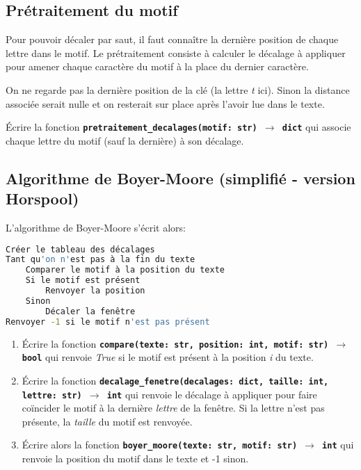 \documentclass[a4paper,11pt]{article}
\begin{document}
\subsection{Prétraitement du motif}
Pour pouvoir décaler par saut, il faut connaître la dernière position de chaque lettre dans le motif. Le prétraitement consiste à calculer le décalage à appliquer pour amener chaque caractère du motif à la place du dernier caractère.
\begin{aretenir}[Remarque]
    On ne regarde pas la dernière position de la clé (la lettre \emph{t} ici). Sinon la distance associée serait nulle et on resterait sur place après l’avoir lue dans le texte.
\end{aretenir}
\begin{activite}
    Écrire la fonction \textbf{\texttt{pretraitement\_decalages(motif: str) $\rightarrow$ dict}} qui associe chaque lettre du motif (sauf la dernière) à son décalage.
\end{activite}
\subsection{Algorithme de Boyer-Moore (simplifié - version Horspool)}
L'algorithme de Boyer-Moore s'écrit alors:
\begin{center}
\begin{lstlisting}[language=Bash, xleftmargin=2em, xrightmargin=2em]
Créer le tableau des décalages
Tant qu'on n'est pas à la fin du texte
    Comparer le motif à la position du texte
    Si le motif est présent
        Renvoyer la position
    Sinon
        Décaler la fenêtre
Renvoyer -1 si le motif n'est pas présent
\end{lstlisting}
\label{algo}
\end{center}

\begin{activite}
    \begin{enumerate}
        \item Écrire la fonction \textbf{\texttt{compare(texte: str, position: int, motif: str) $\rightarrow$ bool}} qui renvoie \emph{True} si le motif est présent à la position \emph{i} du texte.
        \item Écrire la fonction \textbf{\texttt{decalage\_fenetre(decalages: dict, taille: int, lettre: str) $\rightarrow$ int}} qui renvoie le décalage à appliquer pour faire coïncider le motif à la dernière \emph{lettre} de la fenêtre. Si la lettre n'est pas présente, la \emph{taille} du motif est renvoyée.
        \item Écrire alors la fonction \textbf{\texttt{boyer\_moore(texte: str, motif: str) $\rightarrow$ int}} qui renvoie la position du motif dans le texte et -1 sinon.
    \end{enumerate}
\end{activite}
\end{document}
